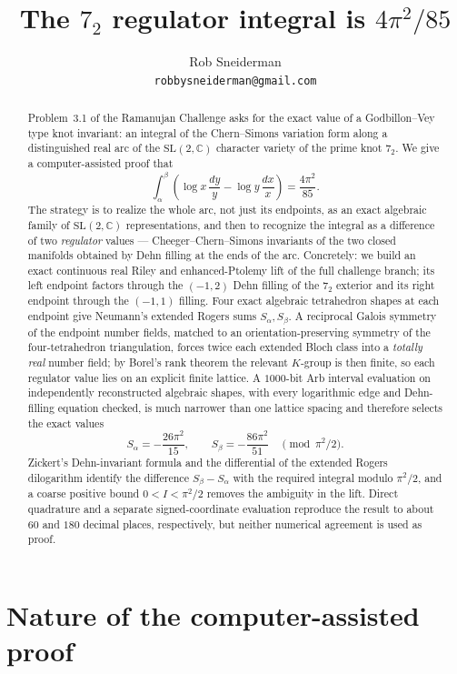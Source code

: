 \documentclass[11pt]{article}
\title{The $7_2$ regulator integral is $4\pi^2/85$}
\author{Rob Sneiderman\\ \texttt{robbysneiderman@gmail.com}}
\date{}
\theoremstyle{definition}
\newcommand{\C}{\mathbb{C}}
\newcommand{\SL}{\mathrm{SL}}
\begin{document}
\maketitle

\begin{abstract}
Problem~3.1 of the Ramanujan Challenge asks for the exact value of a
Godbillon--Vey type knot invariant: an integral of the Chern--Simons
variation form along a distinguished real arc of the $\SL(2,\C)$ character
variety of the prime knot $7_2$.  We give a computer-assisted proof
that
\[
 \int_{\alpha}^{\beta}
 \left(\log x\,\frac{dy}{y}-\log y\,\frac{dx}{x}\right)
 =\frac{4\pi^2}{85}.
\]
The strategy is to realize the whole arc, not just its endpoints, as an exact
algebraic family of $\SL(2,\C)$ representations, and then to recognize the
integral as a difference of two \emph{regulator} values --- Cheeger--Chern--Simons
invariants of the two closed manifolds obtained by Dehn filling at the ends of
the arc.  Concretely: we build an exact continuous real Riley and
enhanced-Ptolemy lift of the full challenge branch; its left endpoint factors
through the $(-1,2)$ Dehn filling of the $7_2$ exterior and its right endpoint
through the $(-1,1)$ filling.  Four exact algebraic tetrahedron shapes at each
endpoint give Neumann's extended Rogers sums $S_\alpha,S_\beta$.  A reciprocal
Galois symmetry of the endpoint number fields, matched to an orientation-preserving
symmetry of the four-tetrahedron triangulation, forces twice each extended Bloch
class into a \emph{totally real} number field; by Borel's rank theorem the
relevant $K$-group is then finite, so each regulator value lies on an explicit
finite lattice.  A $1000$-bit Arb interval evaluation on independently
reconstructed algebraic shapes, with every logarithmic edge
and Dehn-filling equation checked, is much narrower than one lattice spacing and
therefore selects the exact values
\[
 S_\alpha=-\frac{26\pi^2}{15},\qquad
 S_\beta=-\frac{86\pi^2}{51}
 \quad\pmod{\pi^2/2}.
\]
Zickert's Dehn-invariant formula and the differential of the extended Rogers
dilogarithm identify the difference $S_\beta-S_\alpha$ with the required
integral modulo $\pi^2/2$, and a coarse positive bound $0<I<\pi^2/2$ removes the
ambiguity in the lift.  Direct quadrature and a separate signed-coordinate
evaluation reproduce the result to about $60$ and $180$ decimal places,
respectively, but neither numerical agreement is used as proof.
\end{abstract}

\section*{Nature of the computer-assisted proof}
\end{document}
